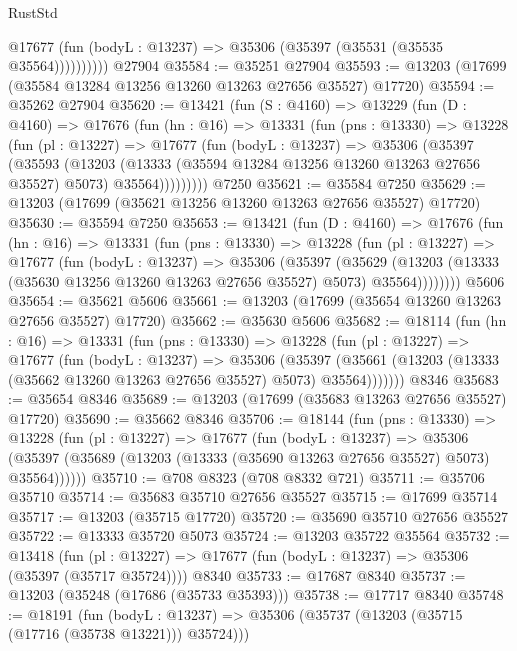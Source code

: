 \begin{lexlean}{RustStd}
\begin{coremodule}
              @17677 (fun (bodyL : @13237) => @35306 (@35397 (@35531 (@35535 @35564))))))))))
    @27904
@35584 := @35251 @27904
@35593 := @13203 (@17699 (@35584 @13284 @13256 @13260 @13263 @27656 @35527) @17720)
@35594 := @35262 @27904
@35620 := @13421
    (fun (S : @4160) =>
    @13229
      (fun (D : @4160) =>
      @17676
        (fun (hn : @16) =>
        @13331
          (fun (pns : @13330) =>
          @13228
            (fun (pl : @13227) =>
            @17677
              (fun (bodyL : @13237) =>
              @35306
                (@35397
                  (@35593
                    (@13203
                      (@13333 (@35594 @13284 @13256 @13260 @13263 @27656 @35527) @5073)
                      @35564)))))))))
    @7250
@35621 := @35584 @7250
@35629 := @13203 (@17699 (@35621 @13256 @13260 @13263 @27656 @35527) @17720)
@35630 := @35594 @7250
@35653 := @13421
    (fun (D : @4160) =>
    @17676
      (fun (hn : @16) =>
      @13331
        (fun (pns : @13330) =>
        @13228
          (fun (pl : @13227) =>
          @17677
            (fun (bodyL : @13237) =>
            @35306
              (@35397
                (@35629
                  (@13203 (@13333 (@35630 @13256 @13260 @13263 @27656 @35527) @5073) @35564))))))))
    @5606
@35654 := @35621 @5606
@35661 := @13203 (@17699 (@35654 @13260 @13263 @27656 @35527) @17720)
@35662 := @35630 @5606
@35682 := @18114
    (fun (hn : @16) =>
    @13331
      (fun (pns : @13330) =>
      @13228
        (fun (pl : @13227) =>
        @17677
          (fun (bodyL : @13237) =>
          @35306
            (@35397
              (@35661 (@13203 (@13333 (@35662 @13260 @13263 @27656 @35527) @5073) @35564)))))))
    @8346
@35683 := @35654 @8346
@35689 := @13203 (@17699 (@35683 @13263 @27656 @35527) @17720)
@35690 := @35662 @8346
@35706 := @18144
    (fun (pns : @13330) =>
    @13228
      (fun (pl : @13227) =>
      @17677
        (fun (bodyL : @13237) =>
        @35306 (@35397 (@35689 (@13203 (@13333 (@35690 @13263 @27656 @35527) @5073) @35564))))))
@35710 := @708 @8323 (@708 @8332 @721)
@35711 := @35706 @35710
@35714 := @35683 @35710 @27656 @35527
@35715 := @17699 @35714
@35717 := @13203 (@35715 @17720)
@35720 := @35690 @35710 @27656 @35527
@35722 := @13333 @35720 @5073
@35724 := @13203 @35722 @35564
@35732 := @13418
    (fun (pl : @13227) => @17677 (fun (bodyL : @13237) => @35306 (@35397 (@35717 @35724))))
    @8340
@35733 := @17687 @8340
@35737 := @13203 (@35248 (@17686 (@35733 @35393)))
@35738 := @17717 @8340
@35748 := @18191
    (fun (bodyL : @13237) => @35306 (@35737 (@13203 (@35715 (@17716 (@35738 @13221))) @35724)))

\end{coremodule}
\end{lexlean}
